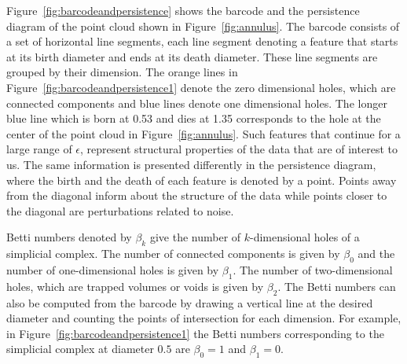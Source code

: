 \documentclass[letter,12pt]{article}
\begin{document}
Figure~\ref{fig:barcodeandpersistence} shows the barcode and the persistence diagram of the point cloud shown in Figure~\ref{fig:annulus}. The barcode consists of a set of horizontal line segments, each line segment denoting a feature that starts at its birth diameter and ends at its death diameter. These line segments are grouped by their dimension. The orange lines in Figure~\ref{fig:barcodeandpersistence1} denote the zero dimensional holes, which are connected components and blue lines denote one dimensional holes. The longer blue line which is born at  0.53 and dies at 1.35 corresponds to the hole at the center of the point cloud in Figure~\ref{fig:annulus}. Such features that continue for a large range of $\epsilon$, represent  structural properties of the data that are of interest to us. The same information is presented differently in the persistence diagram, where the birth and the death of each feature is denoted by a point. Points away from the diagonal inform about the structure of the data while points closer to the diagonal are perturbations related to noise. 

Betti numbers denoted by $\beta_k$ give the number of $k$-dimensional holes of a  simplicial complex. The number of connected components is given by $\beta_0$ and the number of one-dimensional holes is given by $\beta_1$. The number of two-dimensional holes, which are trapped volumes or voids is given by $\beta_2$. The Betti numbers can also be computed from the barcode by drawing a vertical line at the desired diameter and counting the points of intersection for each dimension. For example, in Figure~\ref{fig:barcodeandpersistence1} the Betti numbers corresponding to the simplicial complex at diameter $0.5$ are $\beta_0 = 1$ and $\beta_1 = 0$.  
\end{document}
